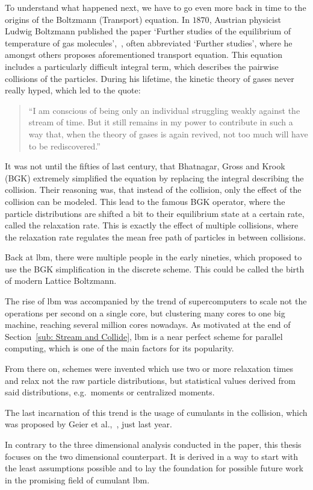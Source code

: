To understand what happened next, we have to go even more back in time to the origins of the Boltzmann (Transport) equation.
In $1870$, Austrian physicist Ludwig Boltzmann published the paper `Further studies of the equilibrium of temperature of gas molecules',~\cite{Boltzmann1970}, often abbreviated `Further studies', where he amongst others proposes aforementioned transport equation.
This equation includes a particularly difficult integral term, which describes the pairwise collisions of the particles.
During his lifetime, the kinetic theory of gases never really hyped, which led to the quote:
\begin{quotation}
``I am conscious of being only an individual struggling weakly against the stream of time.
But it still remains in my power to contribute in such a way that, when the theory of gases is again revived, not too much will have to be rediscovered.''
\end{quotation}
It was not until the fifties of last century, that Bhatnagar, Gross and Krook (BGK) extremely simplified the equation by replacing the integral describing the collision.
Their reasoning was, that instead of the collision, only the effect of the collision can be modeled.
This lead to the famous BGK operator, where the particle distributions are shifted a bit to their equilibrium state at a certain rate, called the relaxation rate.
This is exactly the effect of multiple collisions, where the relaxation rate regulates the mean free path of particles in between collisions.

Back at \gls{lbm}, there were multiple people in the early nineties, which proposed to use the BGK simplification in the discrete scheme.
This could be called the birth of modern Lattice Boltzmann.

The rise of \gls{lbm} was accompanied by the trend of supercomputers to scale not the operations per second on a single core, but clustering many cores to one big machine, reaching several million cores nowadays.
As motivated at the end of Section~\ref{sub: Stream and Collide}, \gls{lbm} is a near perfect scheme for parallel computing, which is one of the main factors for its popularity.

From there on, schemes were invented which use two or more relaxation times and relax not the raw particle distributions, but statistical values derived from said distributions, e.g.\ moments or centralized moments.

The last incarnation of this trend is the usage of cumulants in the collision, which was proposed by Geier et al.,~\cite{geier2015cumulant}, just last year.

In contrary to the three dimensional analysis conducted in the paper, this thesis focuses on the two dimensional counterpart.
It is derived in a way to start with the least assumptions possible and to lay the foundation for possible future work in the promising field of cumulant \gls{lbm}.
